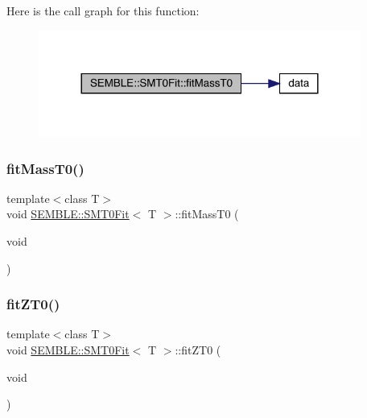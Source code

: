 Here is the call graph for this function\+:
\nopagebreak
\begin{figure}[H]
\begin{center}
\leavevmode
\includegraphics[width=300pt]{d6/dad/structSEMBLE_1_1SMT0Fit_aeeb6d36dda0c5fae9e4bae185f8fadd9_cgraph}
\end{center}
\end{figure}
\mbox{\label{structSEMBLE_1_1SMT0Fit_aeeb6d36dda0c5fae9e4bae185f8fadd9}} 
\subsubsection{\texorpdfstring{fitMassT0()}{fitMassT0()}\hspace{0.1cm}{\footnotesize\ttfamily [2/2]}}
{\footnotesize\ttfamily template$<$class T$>$ \\
void \mbox{\hyperlink{structSEMBLE_1_1SMT0Fit}{S\+E\+M\+B\+L\+E\+::\+S\+M\+T0\+Fit}}$<$ T $>$\+::fit\+Mass\+T0 (\begin{DoxyParamCaption}\item[{void}]{ }\end{DoxyParamCaption})}

\mbox{\label{structSEMBLE_1_1SMT0Fit_aae2f42a0b663e58a7458dee2b7a954f2}} 
\subsubsection{\texorpdfstring{fitZT0()}{fitZT0()}\hspace{0.1cm}{\footnotesize\ttfamily [1/2]}}
{\footnotesize\ttfamily template$<$class T$>$ \\
void \mbox{\hyperlink{structSEMBLE_1_1SMT0Fit}{S\+E\+M\+B\+L\+E\+::\+S\+M\+T0\+Fit}}$<$ T $>$\+::fit\+Z\+T0 (\begin{DoxyParamCaption}\item[{void}]{ }\end{DoxyParamCaption})}

